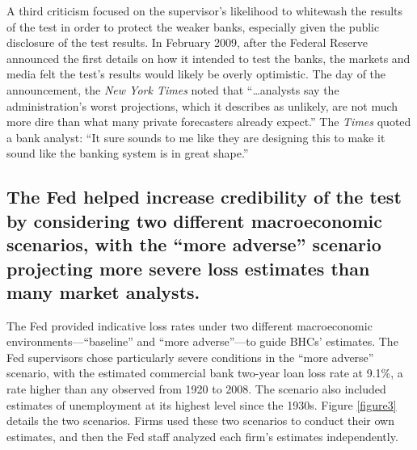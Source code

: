 \documentclass[justified, nobib]{tufte-handout2}
\begin{document}
A third criticism focused on the supervisor's likelihood to whitewash
the results of the test in order to protect the weaker banks, especially given the public disclosure of the test results. In
February 2009, after the Federal Reserve announced the first details on
how it intended to test the banks, the markets and media felt the test's
results would likely be overly optimistic. The day of the announcement,
the \emph{New York Times} noted that ``\ldots{}analysts say
the administration's worst projections, which it describes as unlikely,
are not much more dire than what many private forecasters already
expect.'' The \emph{Times} quoted a bank analyst: ``It sure sounds to me
like they are designing this to make it sound like the banking system is
in great shape.''\citep{NYTimes}

\subsection{The Fed helped increase credibility of the test by
considering two different macroeconomic scenarios, with the ``more adverse''
scenario projecting more severe loss estimates than many market
analysts.}

The Fed provided indicative loss rates under two different macroeconomic
environments---``baseline'' and ``more adverse''---to guide BHCs'
estimates. The Fed supervisors chose particularly severe conditions in
the ``more adverse'' scenario, with the estimated commercial bank
two-year loan loss rate at 9.1\%, a rate higher than any observed from
1920 to 2008. The scenario also included estimates of unemployment at
its highest level since the 1930s. Figure \ref{figure3} details the two scenarios.
Firms used these two scenarios to conduct their own estimates, and then
the Fed staff analyzed each firm's estimates independently.\citep{Results}
\end{document}
